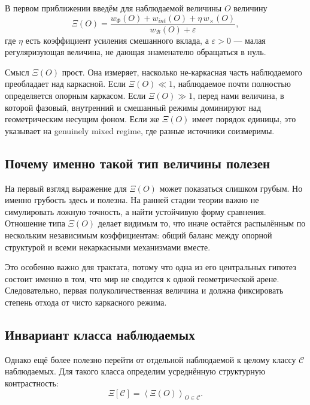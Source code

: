 \documentclass[12pt,a4paper]{article}
\begin{document}
В первом приближении введём для наблюдаемой величины \(O\) величину
\begin{equation}
\Xi(O) = \frac{w_{\Phi}(O) + w_{int}(O) + \eta\, w_{\times}(O)}{w_{\mathcal{B}}(O) + \varepsilon},
\end{equation}
где \(\eta\) есть коэффициент усиления смешанного вклада, а \(\varepsilon > 0\) --- малая регуляризующая величина, не дающая знаменателю обращаться в нуль.

Смысл \(\Xi(O)\) прост. Она измеряет, насколько не-каркасная часть наблюдаемого преобладает над каркасной. Если \(\Xi(O) \ll 1\), наблюдаемое почти полностью определяется опорным каркасом. Если \(\Xi(O) \gg 1\), перед нами величина, в которой фазовый, внутренний и смешанный режимы доминируют над геометрическим несущим фоном. Если же \(\Xi(O)\) имеет порядок единицы, это указывает на genuinely mixed regime, где разные источники соизмеримы.

\subsection{Почему именно такой тип величины полезен}

На первый взгляд выражение для \(\Xi(O)\) может показаться слишком грубым. Но именно грубость здесь и полезна. На ранней стадии теории важно не симулировать ложную точность, а найти устойчивую форму сравнения. Отношение типа \(\Xi(O)\) делает видимым то, что иначе остаётся распылённым по нескольким независимым коэффициентам: общий баланс между опорной структурой и всеми некаркасными механизмами вместе.

Это особенно важно для трактата, потому что одна из его центральных гипотез состоит именно в том, что мир не сводится к одной геометрической арене. Следовательно, первая полуколичественная величина и должна фиксировать степень отхода от чисто каркасного режима.

\subsection{Инвариант класса наблюдаемых}

Однако ещё более полезно перейти от отдельной наблюдаемой к целому классу \(\mathcal{C}\) наблюдаемых. Для такого класса определим усреднённую структурную контрастность:
\begin{equation}
\Xi[\mathcal{C}] = \left\langle \Xi(O) \right\rangle_{O \in \mathcal{C}}.
\end{equation}
\end{document}
